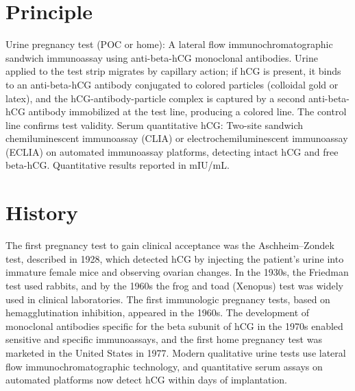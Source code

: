 \section*{Principle}
Urine pregnancy test (POC or home): A lateral flow immunochromatographic sandwich immunoassay using anti-beta-hCG monoclonal antibodies. Urine applied to the test strip migrates by capillary action; if hCG is present, it binds to an anti-beta-hCG antibody conjugated to colored particles (colloidal gold or latex), and the hCG-antibody-particle complex is captured by a second anti-beta-hCG antibody immobilized at the test line, producing a colored line. The control line confirms test validity. Serum quantitative hCG: Two-site sandwich chemiluminescent immunoassay (CLIA) or electrochemiluminescent immunoassay (ECLIA) on automated immunoassay platforms, detecting intact hCG and free beta-hCG. Quantitative results reported in mIU/mL.
\section*{History}
The first pregnancy test to gain clinical acceptance was the Aschheim--Zondek test, described in 1928, which detected hCG by injecting the patient's urine into immature female mice and observing ovarian changes. In the 1930s, the Friedman test used rabbits, and by the 1960s the frog and toad (Xenopus) test was widely used in clinical laboratories. The first immunologic pregnancy tests, based on hemagglutination inhibition, appeared in the 1960s. The development of monoclonal antibodies specific for the beta subunit of hCG in the 1970s enabled sensitive and specific immunoassays, and the first home pregnancy test was marketed in the United States in 1977. Modern qualitative urine tests use lateral flow immunochromatographic technology, and quantitative serum assays on automated platforms now detect hCG within days of implantation.
